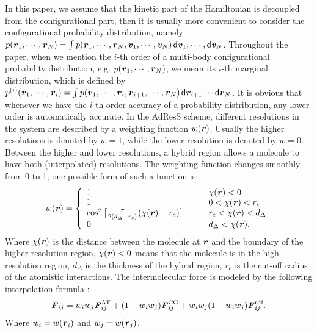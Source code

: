 \documentclass[aip,jcp,a4paper,reprint,onecolumn]{revtex4-1}
\newcommand{\redc}[1]{{\color{red} #1}}
\newcommand{\vect}[1]{\textbf{\textit{#1}}}
\newcommand{\dd}[1]{\textsf{#1}}
\newcommand{\AT}{{\textrm{{AT}}}}
\newcommand{\CG}{{\textrm{CG}}}
\newcommand{\HY}{{\Delta}}
\newcommand{\rdf}{{\textrm{rdf}}}
\begin{document}
  In this paper, we assume that
  the kinetic part of the Hamiltonian is decoupled from the configurational part, then
  it is usually more convenient to consider the configurational
  probability distribution, namely $ p(\vect r_1,\cdots,\vect r_N) =
  \int p(\vect r_1,\cdots,\vect r_N, \vect v_1,\cdots,\vect v_N)\,\dd d\vect v_1,\cdots,\dd d\vect v_N$.
Throughout the paper, when we mention the $i$-th order of a
  multi-body configurational probability distribution, e.g.
  $p(\vect r_1, \cdots, \vect r_N)$, we mean its $i$-th marginal
  distribution, which is defined by
  $p^{(i)}(\vect r_1, \cdots, \vect r_i)
  = \int p(\vect r_1, \cdots, \vect r_i, \vect r_{i+1}, \cdots, \vect r_N)\,
  \dd d \vect r_{i+1}\cdots\dd d \vect r_N$.
  It is obvious that
  whenever we have the $i$-th order accuracy of a probability distribution,
  any lower  order is automatically accurate.
In the AdResS scheme,
different resolutions in the system are described by a weighting
function $w(\vect r)$. Usually the higher resolutions is
denoted by $w = 1$, while the lower resolution is denoted by $w = 0$.
Between the higher and lower resolutions, a hybrid region allows a 
molecule to have both (interpolated) resolutions. The weighting function changes smoothly
from 0 to 1; one possible form of such a function is:
\redc{
\begin{align}\label{eqn:new-w}
  w(\vect r) =
  \left\{
    \begin{array}{lcl}
      1 &\quad& \chi(\vect r) < 0\\
      1  && 0 < \chi(\vect r) < r_c\\
      \cos^2\big[\frac{\pi}{2(d_{\HY} - r_c)} (\chi(\vect r) - r_c)\big] && r_c < \chi(\vect r) < d_{\HY} \\
      0 &&  d_{\HY}  < \chi(\vect r).
    \end{array}
  \right.
\end{align}
Where $\chi(\vect r)$ is the distance between the
molecule at $\vect r$ and the boundary of the higher resolution
region, $\chi(\vect r) < 0$ }means that the molecule is in the high resolution
region, $d_{\HY}$ is the thickness of the hybrid region, $r_c$ is the
cut-off radius of the atomistic interactions.  The intermolecular force is modeled by the following
interpolation formula \cite{rdfcorr}:
\redc{
\begin{align}
  \vect F_{ij} =
  w_i w_j\vect F^{\AT}_{ij} +
  (1-w_i w_j)\vect F^{\CG}_{i j} +
  w_i w_j (1-w_i w_j)\vect F_{ij}^{\rdf}.
\label{grf}
\end{align}
Where $w_i = w(\vect r_i)$ and $w_j = w(\vect r_j)$.}
\end{document}
